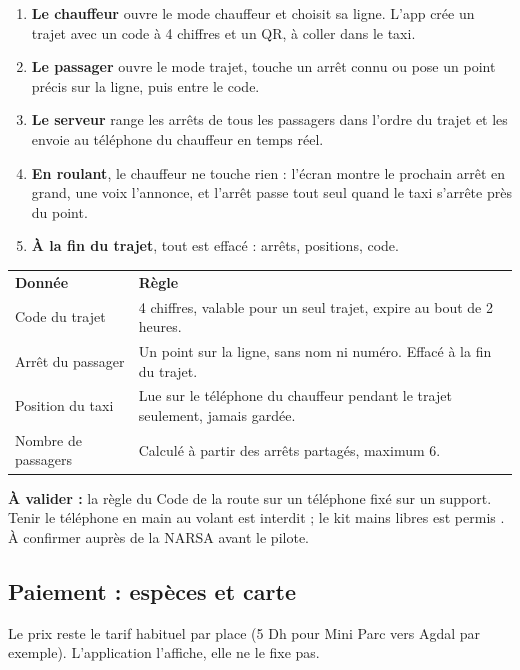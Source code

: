 \documentclass[11pt,a4paper]{article}
\newcommand{\hd}[1]{\textbf{\color{white}#1}}
\newcommand{\hdrow}{\rowcolor{brand}}
\newcommand{\valider}[1]{\begin{avalider}\textbf{À valider :} #1\end{avalider}}
\begin{document}
\begin{enumerate}
\item \textbf{Le chauffeur} ouvre le mode chauffeur et choisit sa ligne. L'app crée un trajet avec un code à 4 chiffres et un QR, à coller dans le taxi.
\item \textbf{Le passager} ouvre le mode trajet, touche un arrêt connu ou pose un point précis sur la ligne, puis entre le code.
\item \textbf{Le serveur} range les arrêts de tous les passagers dans l'ordre du trajet et les envoie au téléphone du chauffeur en temps réel.
\item \textbf{En roulant}, le chauffeur ne touche rien : l'écran montre le prochain arrêt en grand, une voix l'annonce, et l'arrêt passe tout seul quand le taxi s'arrête près du point.
\item \textbf{À la fin du trajet}, tout est effacé : arrêts, positions, code.
\end{enumerate}

\Needspace{5cm}
\begin{xltabular}{\textwidth}{@{}P{3.4cm} Y@{}}
\hdrow \hd{Donnée} & \hd{Règle} \\
Code du trajet & 4 chiffres, valable pour un seul trajet, expire au bout de 2 heures. \\
Arrêt du passager & Un point sur la ligne, sans nom ni numéro. Effacé à la fin du trajet. \\
Position du taxi & Lue sur le téléphone du chauffeur pendant le trajet seulement, jamais gardée. \\
Nombre de passagers & Calculé à partir des arrêts partagés, maximum 6. \\
\end{xltabular}

\valider{la règle du Code de la route sur un téléphone fixé sur un support. Tenir le téléphone en main au volant est interdit ; le kit mains libres est permis \cite{mre}. À confirmer auprès de la NARSA avant le pilote.}


\Needspace{8cm}
\subsection{Paiement : espèces et carte}
Le prix reste le tarif habituel par place (5 Dh pour Mini Parc vers Agdal par exemple). L'application l'affiche, elle ne le fixe pas.
\end{document}
